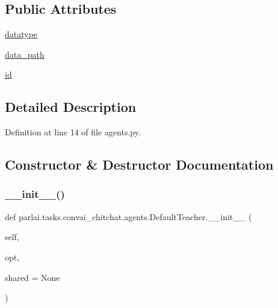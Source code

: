 \subsection*{Public Attributes}
\begin{DoxyCompactItemize}
\item 
\hyperlink{classparlai_1_1tasks_1_1convai__chitchat_1_1agents_1_1DefaultTeacher_a9f90247eb9b5fead9e02ef7e50cc8f37}{datatype}
\item 
\hyperlink{classparlai_1_1tasks_1_1convai__chitchat_1_1agents_1_1DefaultTeacher_a2a216c4d5a2499f39da072f8e8afc44d}{data\+\_\+path}
\item 
\hyperlink{classparlai_1_1tasks_1_1convai__chitchat_1_1agents_1_1DefaultTeacher_acb9a1323c173edc4c95653fcb013fd8e}{id}
\end{DoxyCompactItemize}


\subsection{Detailed Description}


Definition at line 14 of file agents.\+py.



\subsection{Constructor \& Destructor Documentation}
\mbox{\label{classparlai_1_1tasks_1_1convai__chitchat_1_1agents_1_1DefaultTeacher_a67bf5351429e9cb7b94534211a2a6978}} 
\subsubsection{\texorpdfstring{\+\_\+\+\_\+init\+\_\+\+\_\+()}{\_\_init\_\_()}}
{\footnotesize\ttfamily def parlai.\+tasks.\+convai\+\_\+chitchat.\+agents.\+Default\+Teacher.\+\_\+\+\_\+init\+\_\+\+\_\+ (\begin{DoxyParamCaption}\item[{}]{self,  }\item[{}]{opt,  }\item[{}]{shared = {\ttfamily None} }\end{DoxyParamCaption})}



